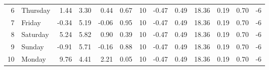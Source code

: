 \begin{table}
\begin{tabular}{rlrrrrrrrrrrr}
6 & Thursday & 1.44 & 3.30 & 0.44 & 0.67 & 10 & -0.47 & 0.49 & 18.36 & 0.19 & 0.70 & -6 \\
7 & Friday & -0.34 & 5.19 & -0.06 & 0.95 & 10 & -0.47 & 0.49 & 18.36 & 0.19 & 0.70 & -6 \\
8 & Saturday & 5.24 & 5.82 & 0.90 & 0.39 & 10 & -0.47 & 0.49 & 18.36 & 0.19 & 0.70 & -6 \\
9 & Sunday & -0.91 & 5.71 & -0.16 & 0.88 & 10 & -0.47 & 0.49 & 18.36 & 0.19 & 0.70 & -6 \\
10 & Monday & 9.76 & 4.41 & 2.21 & 0.05 & 10 & -0.47 & 0.49 & 18.36 & 0.19 & 0.70 & -6 \\
\bottomrule
\end{tabular}
\end{table}

